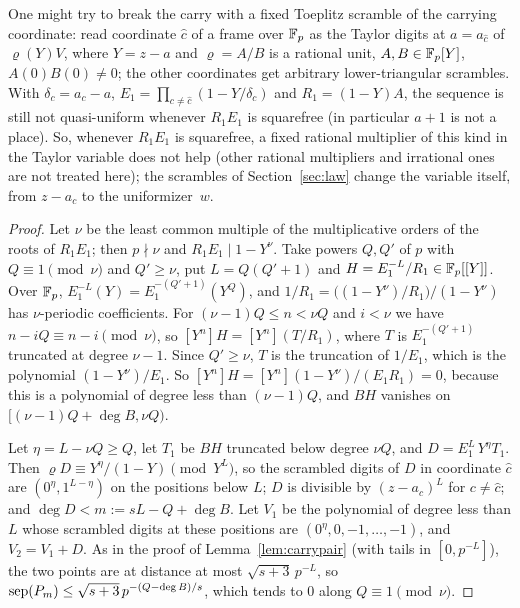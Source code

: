 \begin{remark}\label{rem:toeplitz}
One might try to break the carry with a fixed Toeplitz scramble of the carrying coordinate: read coordinate $\hat c$ of a frame over $\mathbb{F}_p$ as the Taylor digits at $a=a_{\hat c}$ of $\varrho(Y)V$, where $Y=z-a$ and $\varrho=A/B$ is a rational unit, $A,B\in\mathbb{F}_p[Y]$, $A(0)B(0)\ne0$; the other coordinates get arbitrary lower-triangular scrambles. With $\delta_c=a_c-a$, $E_1=\prod_{c\ne\hat c}(1-Y/\delta_c)$ and $R_1=(1-Y)A$, the sequence is still not quasi-uniform whenever $R_1E_1$ is squarefree (in particular $a+1$ is not a place). So, whenever $R_1E_1$ is squarefree, a fixed rational multiplier of this kind in the Taylor variable does not help (other rational multipliers and irrational ones are not treated here); the scrambles of Section~\ref{sec:law} change the variable itself, from $z-a_c$ to the uniformizer~$w$.
\end{remark}

\begin{proof}
Let $\nu$ be the least common multiple of the multiplicative orders of the roots of $R_1E_1$; then $p\nmid\nu$ and $R_1E_1\mid1-Y^\nu$. Take powers $Q,Q'$ of $p$ with $Q\equiv1\pmod\nu$ and $Q'\ge\nu$, put $L=Q(Q'+1)$ and $H=E_1^{-L}/R_1\in\mathbb{F}_p[[Y]]$. Over $\mathbb{F}_p$, $E_1^{-L}(Y)=E_1^{-(Q'+1)}(Y^Q)$, and $1/R_1=\bigl((1-Y^\nu)/R_1\bigr)/(1-Y^\nu)$ has $\nu$-periodic coefficients. For $(\nu-1)Q\le n<\nu Q$ and $i<\nu$ we have $n-iQ\equiv n-i\pmod\nu$, so $[Y^n]H=[Y^n](T/R_1)$, where $T$ is $E_1^{-(Q'+1)}$ truncated at degree $\nu-1$. Since $Q'\ge\nu$, $T$ is the truncation of $1/E_1$, which is the polynomial $(1-Y^\nu)/E_1$. So $[Y^n]H=[Y^n](1-Y^\nu)/(E_1R_1)=0$, because this is a polynomial of degree less than $(\nu-1)Q$, and $BH$ vanishes on $[(\nu-1)Q+\deg B,\nu Q)$.

Let $\eta=L-\nu Q\ge Q$, let $T_1$ be $BH$ truncated below degree $\nu Q$, and $D=E_1^L\,Y^\eta T_1$. Then $\varrho D\equiv Y^\eta/(1-Y)\pmod{Y^L}$, so the scrambled digits of $D$ in coordinate $\hat c$ are $(0^\eta,1^{L-\eta})$ on the positions below $L$; $D$ is divisible by $(z-a_c)^L$ for $c\ne\hat c$; and $\deg D<m:=sL-Q+\deg B$. Let $V_1$ be the polynomial of degree less than $L$ whose scrambled digits at these positions are $(0^\eta,0,-1,\dots,-1)$, and $V_2=V_1+D$. As in the proof of Lemma~\ref{lem:carrypair} (with tails in $[0,p^{-L}]$), the two points are at distance at most $\sqrt{s+3}\,p^{-L}$, so $\operatorname{sep}(P_m)\le\sqrt{s+3}\,p^{-(Q-\deg B)/s}$, which tends to $0$ along $Q\equiv1\pmod\nu$.
\end{proof}

